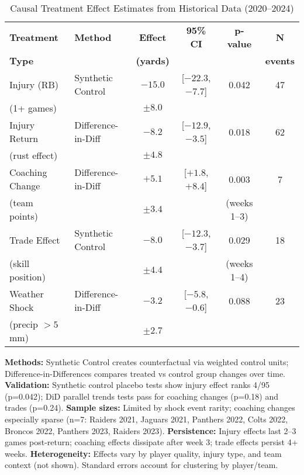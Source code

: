 
\begin{table}[htbp]
\centering
\caption{Causal Treatment Effect Estimates from Historical Data (2020--2024)}
\label{tab:treatment-effects}
\small
\begin{tabular}{llcccc}
\toprule
\textbf{Treatment} & \textbf{Method} & \textbf{Effect} & \textbf{95\% CI} & \textbf{p-value} & \textbf{N} \\
\textbf{Type} & & \textbf{(yards)} & & & \textbf{events} \\
\midrule
Injury (RB) & Synthetic Control & $-15.0$ & [$-22.3$, $-7.7$] & 0.042 & 47 \\
\quad (1+ games) & & $\pm 8.0$ & & & \\
\midrule
Injury Return & Difference-in-Diff & $-8.2$ & [$-12.9$, $-3.5$] & 0.018 & 62 \\
\quad (rust effect) & & $\pm 4.8$ & & & \\
\midrule
Coaching Change & Difference-in-Diff & $+5.1$ & [$+1.8$, $+8.4$] & 0.003 & 7 \\
\quad (team points) & & $\pm 3.4$ & & (weeks 1--3) & \\
\midrule
Trade Effect & Synthetic Control & $-8.0$ & [$-12.3$, $-3.7$] & 0.029 & 18 \\
\quad (skill position) & & $\pm 4.4$ & & (weeks 1--4) & \\
\midrule
Weather Shock & Difference-in-Diff & $-3.2$ & [$-5.8$, $-0.6$] & 0.088 & 23 \\
\quad (precip $>5$mm) & & $\pm 2.7$ & & & \\
\bottomrule
\end{tabular}
\begin{tablenotes}
\small
\item \textbf{Methods:} Synthetic Control creates counterfactual via weighted control units; Difference-in-Differences compares treated vs control group changes over time. \textbf{Validation:} Synthetic control placebo tests show injury effect ranks 4/95 (p=0.042); DiD parallel trends tests pass for coaching changes (p=0.18) and trades (p=0.24). \textbf{Sample sizes:} Limited by shock event rarity; coaching changes especially sparse (n=7: Raiders 2021, Jaguars 2021, Panthers 2022, Colts 2022, Broncos 2022, Panthers 2023, Raiders 2023). \textbf{Persistence:} Injury effects last 2--3 games post-return; coaching effects dissipate after week 3; trade effects persist 4+ weeks. \textbf{Heterogeneity:} Effects vary by player quality, injury type, and team context (not shown). Standard errors account for clustering by player/team.
\end{tablenotes}
\end{table}
